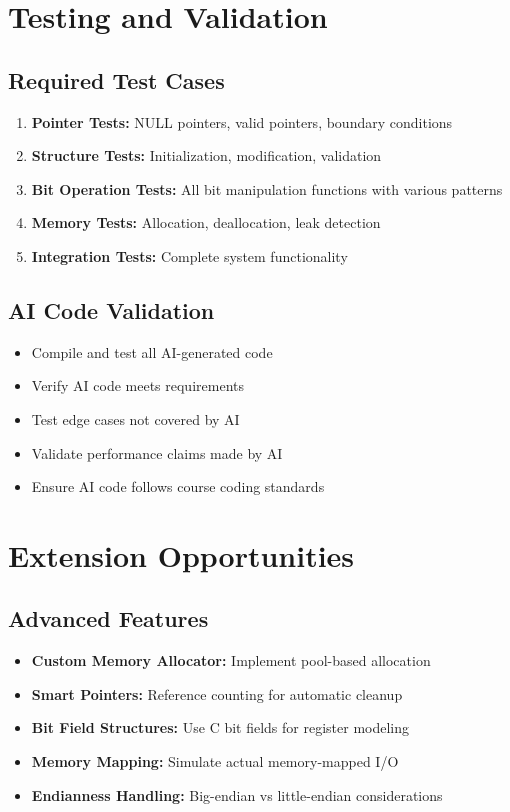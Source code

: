 \documentclass[11pt,a4paper]{article}
\begin{document}
\section{Testing and Validation}

\subsection{Required Test Cases}
\begin{enumerate}
    \item \textbf{Pointer Tests:} NULL pointers, valid pointers, boundary conditions
    \item \textbf{Structure Tests:} Initialization, modification, validation
    \item \textbf{Bit Operation Tests:} All bit manipulation functions with various patterns
    \item \textbf{Memory Tests:} Allocation, deallocation, leak detection
    \item \textbf{Integration Tests:} Complete system functionality
\end{enumerate}

\subsection{AI Code Validation}
\begin{itemize}
    \item Compile and test all AI-generated code
    \item Verify AI code meets requirements
    \item Test edge cases not covered by AI
    \item Validate performance claims made by AI
    \item Ensure AI code follows course coding standards
\end{itemize}

\section{Extension Opportunities}

\subsection{Advanced Features}
\begin{itemize}
    \item \textbf{Custom Memory Allocator:} Implement pool-based allocation
    \item \textbf{Smart Pointers:} Reference counting for automatic cleanup
    \item \textbf{Bit Field Structures:} Use C bit fields for register modeling
    \item \textbf{Memory Mapping:} Simulate actual memory-mapped I/O
    \item \textbf{Endianness Handling:} Big-endian vs little-endian considerations
\end{itemize}
\end{document}
